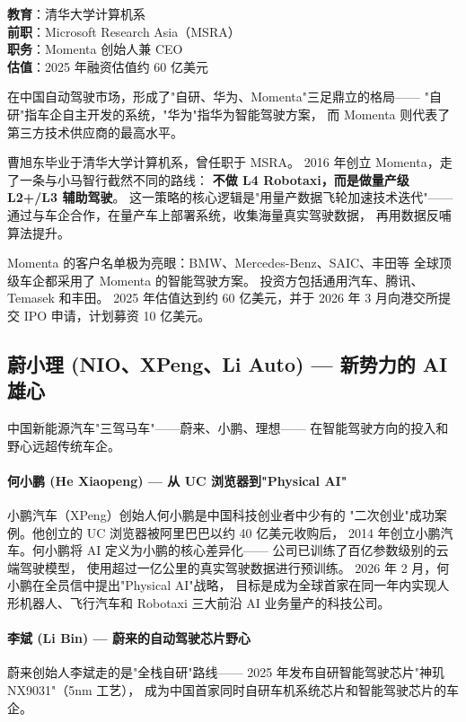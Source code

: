 \begin{keybox}
\textbf{教育}：清华大学计算机系 \\
\textbf{前职}：Microsoft Research Asia（MSRA）\\
\textbf{职务}：Momenta 创始人兼 CEO \\
\textbf{估值}：2025 年融资估值约 60 亿美元
\end{keybox}

在中国自动驾驶市场，形成了"自研、华为、Momenta"三足鼎立的格局——
"自研"指车企自主开发的系统，"华为"指华为智能驾驶方案，
而 Momenta 则代表了第三方技术供应商的最高水平。

曹旭东毕业于清华大学计算机系，曾任职于 MSRA。
2016 年创立 Momenta，走了一条与小马智行截然不同的路线：
\textbf{不做 L4 Robotaxi，而是做量产级 L2+/L3 辅助驾驶}。
这一策略的核心逻辑是"用量产数据飞轮加速技术迭代"——
通过与车企合作，在量产车上部署系统，收集海量真实驾驶数据，
再用数据反哺算法提升。

Momenta 的客户名单极为亮眼：BMW、Mercedes-Benz、SAIC、丰田等
全球顶级车企都采用了 Momenta 的智能驾驶方案。
投资方包括通用汽车、腾讯、Temasek 和丰田。
2025 年估值达到约 60 亿美元，并于 2026 年 3 月向港交所提交
IPO 申请，计划募资 10 亿美元。


\subsection{蔚小理 (NIO、XPeng、Li Auto) — 新势力的 AI 雄心}

中国新能源汽车"三驾马车"——蔚来、小鹏、理想——
在智能驾驶方向的投入和野心远超传统车企。

\paragraph{何小鹏 (He Xiaopeng) — 从 UC 浏览器到"Physical AI"}
小鹏汽车（XPeng）创始人何小鹏是中国科技创业者中少有的
"二次创业"成功案例。他创立的 UC 浏览器被阿里巴巴以约 40 亿美元收购后，
2014 年创立小鹏汽车。何小鹏将 AI 定义为小鹏的核心差异化——
公司已训练了百亿参数级别的云端驾驶模型，
使用超过一亿公里的真实驾驶数据进行预训练。
2026 年 2 月，何小鹏在全员信中提出"Physical AI"战略，
目标是成为全球首家在同一年内实现人形机器人、飞行汽车和
Robotaxi 三大前沿 AI 业务量产的科技公司。

\paragraph{李斌 (Li Bin) — 蔚来的自动驾驶芯片野心}
蔚来创始人李斌走的是"全栈自研"路线——
2025 年发布自研智能驾驶芯片"神玑 NX9031"（5nm 工艺），
成为中国首家同时自研车机系统芯片和智能驾驶芯片的车企。


